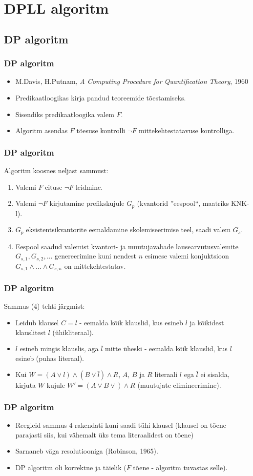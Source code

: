 \documentclass{beamer}
\begin{document}
\section{DPLL algoritm}
\subsection{DP algoritm}
\frame
{
	\frametitle{DP algoritm}
	
	\begin{itemize}
		\item M.Davis, H.Putnam, \emph{A Computing Procedure for Quantification Theory}, 1960
		\item Predikaatloogikas kirja pandud teoreemide tõestamiseks.
		\item Sisendiks predikaatloogika valem $F$.
		\item Algoritm asendas $F$ tõesuse kontrolli $\neg F$ mittekehtestatavuse kontrolliga.
	\end{itemize}
}
\frame
{
	\frametitle{DP algoritm}
	
	Algoritm koosnes neljast sammust:
	\begin{enumerate}
		\item Valemi $F$ eituse $\neg F$ leidmine.
		\item Valemi $\neg F$ kirjutamine prefikskujule $G_p$ (kvantorid ''eespool``, maatriks KNK-l).
		\item $G_p$ eksistentsikvantorite eemaldamine skolemiseerimise teel, saadi valem $G_s$.
		\item Eespool saadud valemist kvantori- ja muutujavabade lausearvutusvalemite
		$G_{s,1},G_{s,2},\dots$ genereerimine kuni nendest $n$ esimese valemi
		konjuktsioon $G_{s,1}\wedge\dots\wedge G_{s,n}$ on mittekehtestatav. 
	\end{enumerate}
}
\frame
{
	\frametitle{DP algoritm}
	
	Sammus (4) tehti järgmist:
	\begin{itemize}
		\item Leidub klausel $C=l$ - eemalda kõik klauslid,
		kus esineb $l$ ja kõikidest klauslitest $\bar{l}$ (ühikliteraal).
		\item $l$ esineb mingis klauslis, aga $\bar{l}$ mitte üheski - eemalda
		kõik klauslid, kus $l$ esineb (puhas literaal).
		\item Kui $W=(A\vee l)\wedge(B\vee \bar{l})\wedge R$, $A$,
   		$B$ ja $R$ literaali $l$ ega $\bar{l}$ ei sisalda,
   		kirjuta $W$ kujule $W'=(A\vee B\vee)\wedge R$ (muutujate elimineerimine).
	\end{itemize}
}
\frame
{
	\frametitle{DP algoritm}
	
	\begin{itemize}
		\item Reegleid sammus 4 rakendati kuni saadi tühi klausel
		(klausel on tõene parajasti siis, kui vähemalt üks tema literaalidest on tõene)
		\item Sarnaneb väga resolutiooniga (Robinson, 1965).
		\item DP algoritm oli korrektne ja täielik ($F$ tõene - algoritm tuvastas selle).
	\end{itemize}
}
\end{document}
